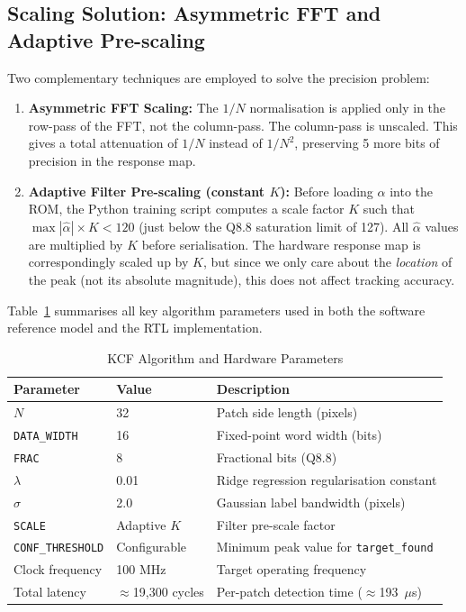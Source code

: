 \documentclass[a4paper,12pt]{report}
\begin{document}
\subsection{Scaling Solution: Asymmetric FFT and Adaptive Pre-scaling}

Two complementary techniques are employed to solve the precision problem:

\begin{enumerate}
    \item \textbf{Asymmetric FFT Scaling:} The $1/N$ normalisation is applied only in the row-pass of the FFT, not the column-pass. The column-pass is unscaled. This gives a total attenuation of $1/N$ instead of $1/N^2$, preserving 5 more bits of precision in the response map.
    \item \textbf{Adaptive Filter Pre-scaling (constant $K$):} Before loading $\hat{\alpha}$ into the ROM, the Python training script computes a scale factor $K$ such that $\max|\hat{\alpha}| \times K < 120$ (just below the Q8.8 saturation limit of 127). All $\hat{\alpha}$ values are multiplied by $K$ before serialisation. The hardware response map is correspondingly scaled up by $K$, but since we only care about the \emph{location} of the peak (not its absolute magnitude), this does not affect tracking accuracy.
\end{enumerate}

Table~\ref{tab:params} summarises all key algorithm parameters used in both the software reference model and the RTL implementation.

\begin{table}[ht]
\centering
\caption{KCF Algorithm and Hardware Parameters}
\vspace{0.2cm}
\label{tab:params}
\begin{tabular}{|l|l|l|}
\hline
\textbf{Parameter} & \textbf{Value} & \textbf{Description} \\ \hline
$N$ & 32 & Patch side length (pixels) \\ \hline
\texttt{DATA\_WIDTH} & 16 & Fixed-point word width (bits) \\ \hline
\texttt{FRAC} & 8 & Fractional bits (Q8.8) \\ \hline
$\lambda$ & 0.01 & Ridge regression regularisation constant \\ \hline
$\sigma$ & 2.0 & Gaussian label bandwidth (pixels) \\ \hline
\texttt{SCALE} & Adaptive $K$ & Filter pre-scale factor \\ \hline
\texttt{CONF\_THRESHOLD} & Configurable & Minimum peak value for \texttt{target\_found} \\ \hline
Clock frequency & 100 MHz & Target operating frequency \\ \hline
Total latency & $\approx$19{,}300 cycles & Per-patch detection time ($\approx$193~$\mu$s) \\ \hline
\end{tabular}
\end{table}
\end{document}
